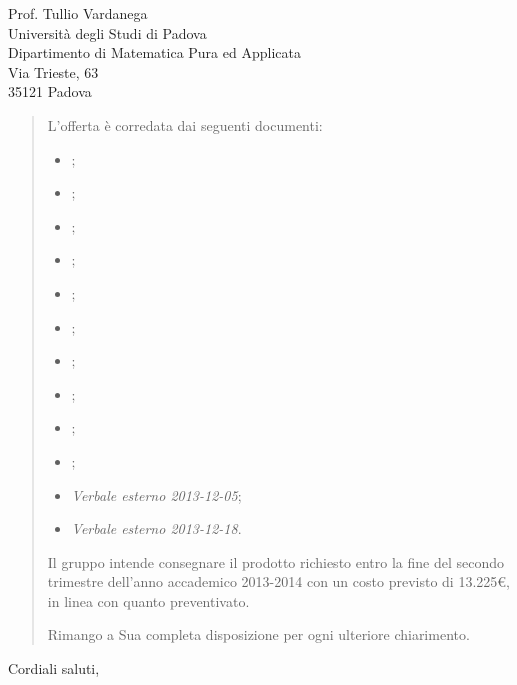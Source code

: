 \documentclass{letter}
\begin{document}
\begin{letter}{
	Prof. Tullio Vardanega \\
	Università degli Studi di Padova \\
	Dipartimento di Matematica Pura ed Applicata \\
	Via Trieste, 63 \\
	35121 Padova
}
\begin{quotation}
	L'offerta è corredata dai seguenti documenti:

	\begin{itemize}

		\item \AnalisiDeiRequisiti{};
		\item \DefinizioneDiProdotto{};
		\item \Glossario{};
		\item \ManualeAdmin{};
		\item \ManualeSviluppatore{};
		\item \ManualeUtente{};
		\item \NormeDiProgetto{};
		\item \PianoDiProgetto{};
		\item \PianoDiQualifica{};
		\item \SpecificaTecnica{};
		\item \emph{Verbale esterno 2013-12-05};
		\item \emph{Verbale esterno 2013-12-18}.

	\end{itemize}

	Il gruppo \GroupName{} intende consegnare il prodotto richiesto entro la fine del secondo trimestre dell'anno accademico 2013-2014 con un costo previsto di 13.225\euro, in linea con quanto preventivato.

	Rimango a Sua completa disposizione per ogni ulteriore chiarimento.

\end{quotation}

\closing{Cordiali saluti,}


\end{letter}
\end{document}
